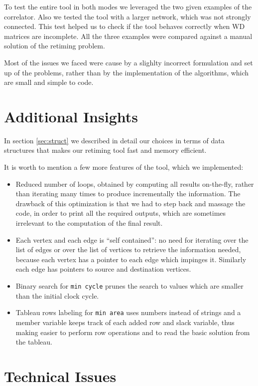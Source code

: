 \documentclass{acm_proc_article-sp}
\begin{document}
To test the entire tool in both modes we leveraged the two given examples of
the correlator. Also we tested the tool with a larger network, which was not
strongly connected. This test helped us to check if the tool behaves correctly
when WD matrices are incomplete.
All the three examples were compared against a manual solution of the retiming
problem.

Most of the issues we faced were cause by a slighlty incorrect formulation and
set up of the problems, rather than by the implementation of the algorithms,
which are small and simple to code.


\section{Additional Insights}

In section \ref{sec:struct} we described in detail our choices in terms of data
structures that makes our retiming tool fast and memory efficient.

It is worth to mention a few more features of the tool, which we implemented:
\begin{itemize}
  \item Reduced number of loops, obtained by computing all results
    on-the-fly, rather than iterating many times to produce incrementally
    the information. The drawback of this optimization is that we had to step back
    and massage the code, in order to print all the required outputs, which
    are sometimes irrelevant to the computation of the final result.
  \item Each vertex and each edge is ``self contained'': no need for iterating
    over the list of edges or over the list of vertices to retrieve the
    information needed, because each vertex has a pointer to each edge
    which impinges it. Similarly each edge has pointers to source and destination
    vertices.
    \item Binary search for \texttt{min cycle} prunes the search to values which
      are smaller than the initial clock cycle.
    \item Tableau rows labeling for \texttt{min area} uses numbers instead of
      strings and a member variable keeps track of each added row and slack variable,
      thus making easier to perform row operations and to read the basic solution
      from the tableau.
\end{itemize}

\section{Technical Issues}
\label{sec:tech}
\end{document}

